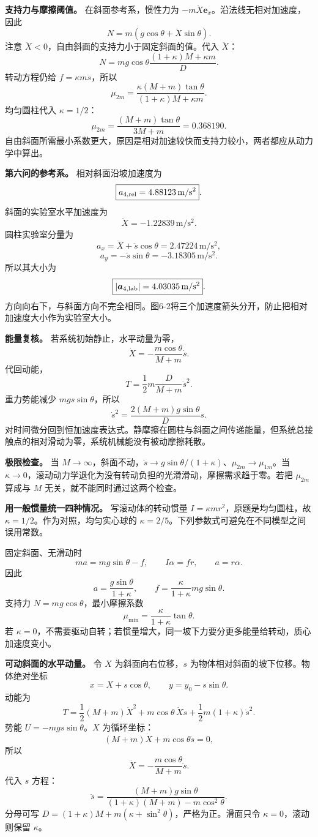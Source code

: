 \documentclass[12pt,a4paper,UTF8]{ctexart}
\begin{document}
\textbf{支持力与摩擦阈值。} 在斜面参考系，惯性力为
\(-m\ddot X\boldsymbol e_x\)。沿法线无相对加速度，因此 \[
N=m(g\cos\theta+\ddot X\sin\theta).
\] 注意 \(\ddot X<0\)，自由斜面的支持力小于固定斜面的值。代入
\(\ddot X\)： \[
\boxed{N=mg\cos\theta
\frac{(1+\kappa)M+\kappa m}{D}}.
\] 转动方程仍给 \(f=\kappa m\ddot s\)，所以 \[
\boxed{\mu_{2m}=
\frac{\kappa(M+m)\tan\theta}
{(1+\kappa)M+\kappa m}}.
\] 均匀圆柱代入 \(\kappa=1/2\)： \[
\boxed{\mu_{2m}=
\frac{(M+m)\tan\theta}{3M+m}
=0.368190}.
\]
自由斜面所需最小系数更大，原因是相对加速较快而支持力较小，两者都应从动力学中算出。

\textbf{第六问的参考系。} 相对斜面沿坡加速度为 \[
\boxed{a_{4,\rm rel}=4.88123\,\mathrm{m/s^2}}.
\] 斜面的实验室水平加速度为 \[
\boxed{\ddot X=-1.22839\,\mathrm{m/s^2}}.
\] 圆柱实验室分量为 \[
a_x=\ddot X+\ddot s\cos\theta
=2.47224\,\mathrm{m/s^2},
\] \[
a_y=-\ddot s\sin\theta
=-3.18305\,\mathrm{m/s^2}.
\] 所以其大小为 \[
\boxed{|\boldsymbol a_{4,\rm lab}|=4.03035\,\mathrm{m/s^2}}.
\]
方向向右下，与斜面方向不完全相同。图6-2将三个加速度箭头分开，防止把相对加速度大小作为实验室大小。

\textbf{能量复核。} 若系统初始静止，水平动量为零， \[
\dot X=-\frac{m\cos\theta}{M+m}\dot s.
\] 代回动能， \[
T=\frac12m\frac{D}{M+m}\dot s^2.
\] 重力势能减少 \(mg s\sin\theta\)，所以 \[
\dot s^2=\frac{2(M+m)g\sin\theta}{D}s.
\]
对时间微分回到恒加速度表达式。静摩擦在圆柱与斜面之间传递能量，但系统总接触点的相对滑动为零，系统机械能没有被动摩擦耗散。

\textbf{极限检查。} 当
\(M\to\infty\)，斜面不动，\(\ddot s\to g\sin\theta/(1+\kappa)\)、\(\mu_{2m}\to\mu_{1m}\)。当
\(\kappa\to0\)，滚动动力学退化为没有转动负担的光滑滑动，摩擦需求趋于零。若把
\(\mu_{2m}\) 算成与 \(M\) 无关，就不能同时通过这两个检查。

\textbf{用一般惯量统一四种情况。} 写滚动体的转动惯量
\(I=\kappa mr^2\)，原题是均匀圆柱，故
\(\kappa=1/2\)。作为对照，均匀实心球的
\(\kappa=2/5\)。下列参数式可避免在不同模型之间误用常数。

固定斜面、无滑动时 \[
ma=mg\sin\theta-f,\qquad
I\alpha=fr,\qquad a=r\alpha.
\] 因此 \[
a=\frac{g\sin\theta}{1+\kappa},\qquad
f=\frac{\kappa}{1+\kappa}mg\sin\theta.
\] 支持力 \(N=mg\cos\theta\)，最小摩擦系数 \[
\mu_{\min}=\frac{\kappa}{1+\kappa}\tan\theta.
\] 若
\(\kappa=0\)，不需要驱动自转；若惯量增大，同一坡下力要分更多能量给转动，质心加速度变小。

\textbf{可动斜面的水平动量。} 令 \(X\) 为斜面向右位移，\(s\)
为物体相对斜面的坡下位移。物体绝对坐标 \[
x=X+s\cos\theta,\qquad y=y_0-s\sin\theta.
\] 动能为 \[
T=\frac12(M+m)\dot X^2
+m\cos\theta\,\dot X\dot s
+\frac12m(1+\kappa)\dot s^2.
\] 势能 \(U=-mgs\sin\theta\)。\(X\) 为循环坐标： \[
(M+m)\dot X+m\cos\theta\dot s=0,
\] 所以 \[
\ddot X=-\frac{m\cos\theta}{M+m}\ddot s.
\] 代入 \(s\) 方程： \[
\boxed{\ddot s=
\frac{(M+m)g\sin\theta}
{(1+\kappa)(M+m)-m\cos^2\theta}}.
\] 分母可写 \(D=(1+\kappa)M+m(\kappa+\sin^2\theta)\)，严格为正。滑面只令
\(\kappa=0\)，滚动则保留 \(\kappa\)。
\end{document}
